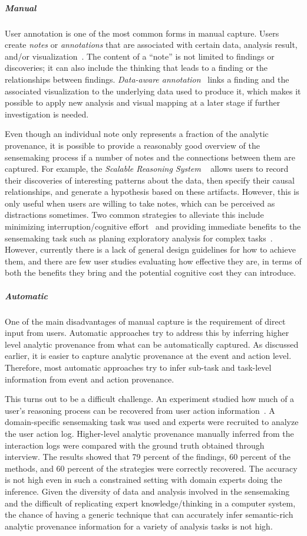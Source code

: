 \subparagraph{Manual}
User annotation is one of the most common forms in manual capture. Users create \emph{notes} or \emph{annotations} that are associated with certain data, analysis result, and/or visualization~\cite{Heer2009,Walker2013}. The content of a ``note'' is not limited to findings or discoveries; it can also include the thinking that leads to a finding or the relationships between findings. \emph{Data-aware annotation}~\cite{Heer2008a} links a finding and the associated visualization to the underlying data used to produce it, which makes it possible to apply new analysis and visual mapping at a later stage if further investigation is needed. 

Even though an individual note only represents a fraction of the analytic provenance, it is possible to provide a reasonably good overview of the sensemaking process if a number of notes and the connections between them are captured. For example, the \emph{Scalable Reasoning System} ~\cite{Pike2009a} allows users to record their discoveries of interesting patterns about the data, then specify their causal relationships, and generate a hypothesis based on these artifacts. However, this is only useful when users are willing to take notes, which can be perceived as distractions sometimes. Two common strategies to alleviate this include minimizing interruption/cognitive effort~\cite{Hong2008} and providing immediate benefits to the sensemaking task such as planing exploratory analysis for complex tasks~\cite{Lunzer2014}. However, currently there is a lack of general design guidelines for how to achieve them, and there are few user studies evaluating how effective they are, in terms of both the benefits they bring and the potential cognitive cost they can introduce. 

\subparagraph{Automatic}
One of the main disadvantages of manual capture is the requirement of direct input from users. Automatic approaches try to address this by inferring higher level analytic provenance from what can be automatically captured. As discussed earlier, it is easier to capture analytic provenance at the event and action level. Therefore, most automatic approaches try to infer sub-task and task-level information from event and action provenance.

This turns out to be a difficult challenge. An experiment studied how much of a user's reasoning process can be recovered from user action information~\cite{Dou2009}. A domain-specific sensemaking task was used and experts were recruited to analyze the user action log. Higher-level analytic provenance manually inferred from the interaction logs were compared with the ground truth obtained through interview. The results showed that 79 percent of the findings, 60 percent of the methods, and 60 percent of the strategies were correctly recovered. The accuracy is not high even in such a constrained setting with domain experts doing the inference. Given the diversity of data and analysis involved in the sensemaking and the difficult of replicating expert knowledge/thinking in a computer system, the chance of having a generic technique that can accurately infer semantic-rich analytic provenance information for a variety of analysis tasks is not high.

